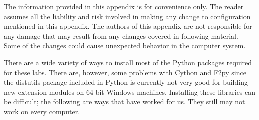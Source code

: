 \label{win64install}


\begin{warn}
The information provided in this appendix is for convenience only.
The reader assumes all the liability and risk involved in making any change to configuration mentioned in this appendix.
The authors of this appendix are not responsible for any damage that may result from any changes covered in following material.
Some of the changes could cause unexpected behavior in the computer system.
\end{warn}

There are a wide variety of ways to install most of the Python packages required for these labs.
There are, however, some problems with Cython and F2py since the distutils package included in Python is currently not very good for building new extension modules on 64 bit Windows machines.
Installing these libraries can be difficult; the following are ways that have worked for us.
They still may not work on every computer.

